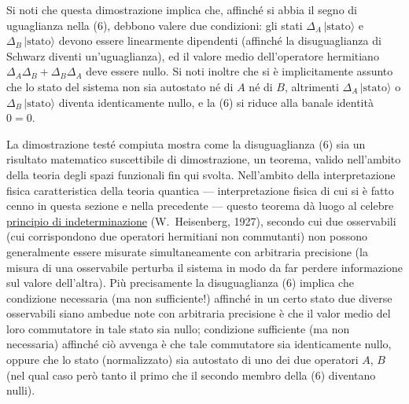 \documentclass[11pt, a4paper]{book}
\numberwithin{equation}{section}
\begin{document}
Si noti che questa dimostrazione implica che, affinché si abbia
il segno di uguaglianza nella (6), debbono valere due condizioni: gli
stati $\Delta_A\,|\text{stato}\rangle$ e $\Delta_B\,|\text{stato}\rangle$ devono essere linearmente dipendenti
(affinché la disuguaglianza di Schwarz diventi un'uguaglianza), ed il valore medio dell'operatore hermitiano $\Delta_A \Delta_B + \Delta_B \Delta_A$ deve essere
nullo. Si noti inoltre che si è implicitamente assunto che lo stato del sistema non sia autostato né di $A$ né di $B$, altrimenti $\Delta_A\,|\text{stato}\rangle$ o
$\Delta_B\,|\text{stato}\rangle$ diventa identicamente nullo, e la (6) si riduce alla banale
identità $0 = 0$.


La dimostrazione testé compiuta mostra come la disuguaglianza (6) sia un risultato matematico suscettibile di dimostrazione, un
teorema, valido nell'ambito della teoria degli spazi funzionali fin qui
svolta. Nell'ambito della interpretazione fisica caratteristica della teoria quantica --- interpretazione fisica di cui si è fatto cenno in questa
sezione e nella precedente --- questo teorema dà luogo al celebre \uline{principio
di indeterminazione} (W.\ Heisenberg, 1927), secondo cui due osservabili
(cui corrispondono due operatori hermitiani non commutanti) non possono
generalmente essere misurate simultaneamente con arbitraria precisione
(la misura di una osservabile perturba il sistema in modo da far perdere
informazione sul valore dell'altra). Più precisamente la disuguaglianza (6)
implica che condizione necessaria (ma non sufficiente!) affinché in un certo stato due diverse osservabili siano ambedue note con arbitraria precisione è che il valor medio del loro commutatore in tale stato sia nullo; condizione sufficiente (ma non necessaria) affinché ciò avvenga è che tale commutatore sia identicamente nullo, oppure che lo stato (normalizzato) sia
autostato di uno dei due operatori $A$, $B$ (nel qual caso però tanto il primo
che il secondo membro della (6) diventano nulli).
\end{document}
